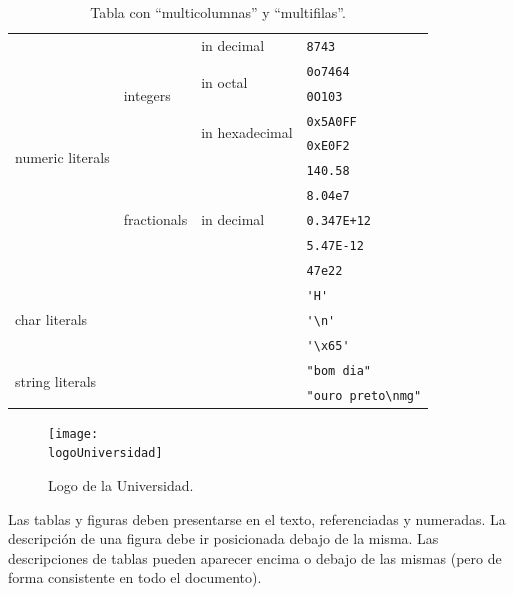 \begin{table}
  \centering

\begin{small}
\begin{tabular}{|l|l|l|l|}\hline
  \multirow{10}{*}{numeric literals} & \multirow{5}{*}{integers} & in decimal & \verb|8743| \\ \cline{3-4}
  & & \multirow{2}{*}{in octal} & \verb|0o7464| \\ \cline{4-4}
  & & & \verb|0O103| \\ \cline{3-4}
  & & \multirow{2}{*}{in hexadecimal} & \verb|0x5A0FF| \\ \cline{4-4}
  & & & \verb|0xE0F2| \\ \cline{2-4}
  & \multirow{5}{*}{fractionals} & \multirow{5}{*}{in decimal} & \verb|140.58| \\ \cline{4-4}
  & & & \verb|8.04e7| \\ \cline{4-4}
  & & & \verb|0.347E+12| \\ \cline{4-4}
  & & & \verb|5.47E-12| \\ \cline{4-4}
  & & & \verb|47e22| \\ \cline{1-4}
  \multicolumn{3}{|l|}{\multirow{3}{*}{char literals}} & \verb|'H'| \\ \cline{4-4}
  \multicolumn{3}{|l|}{} & \verb|'\n'| \\ \cline{4-4}          %
  \multicolumn{3}{|l|}{} & \verb|'\x65'| \\ \cline{1-4}        %
  \multicolumn{3}{|l|}{\multirow{2}{*}{string literals}} & \verb|"bom dia"| \\ \cline{4-4}
  \multicolumn{3}{|l|}{} & \verb|"ouro preto\nmg"| \\ \cline{1-4}          %
\end{tabular}
\end{small}

  \caption{Tabla con ``multicolumnas'' y ``multifilas''.}\label{tab:tablacompleja}
\end{table}





\begin{figure}
  \centering
  \texttt{[image: \\logoUniversidad]}
  \caption{Logo de la Universidad.}
  \label{fig:logo_universidad}
\end{figure}

Las tablas y figuras deben presentarse en el texto, referenciadas y numeradas. La descripción de una figura debe ir posicionada debajo de la misma. Las descripciones de tablas pueden aparecer encima o debajo de las mismas (pero de forma consistente en todo el documento).

